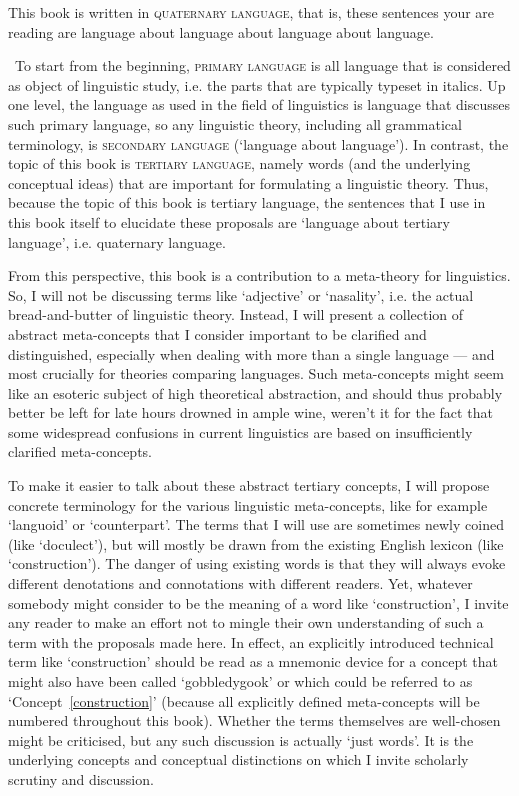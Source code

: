 This book is written in \textsc{quaternary language}, that is, these sentences your are reading are language about language about language about language.



\ \newline To start from the beginning, \textsc{primary language} is all language that is considered as object of linguistic study, i.e. the parts that are typically typeset in italics. Up one level, the language as used in the field of linguistics is language that discusses such primary language, so any linguistic theory, including all grammatical terminology, is \textsc{secondary language} (`language about language'). In contrast, the topic of this book is \textsc{tertiary language}, namely words (and the underlying conceptual ideas) that are important for formulating a linguistic theory. Thus, because the topic of this book is tertiary language, the sentences that I use in this book itself to elucidate these proposals are `language about tertiary language', i.e. quaternary language.

From this perspective, this book is a contribution to a meta-theory for linguistics. So, I will not be discussing terms like `adjective' or `nasality', i.e. the actual bread-and-butter of linguistic theory. Instead, I will present a collection of abstract meta-concepts that I consider important to be clarified and distinguished, especially when dealing with more than a single language --- and most crucially for theories comparing languages. Such meta-concepts might seem like an esoteric subject of high theoretical abstraction, and should thus probably better be left for late hours drowned in ample wine, weren't it for the fact that some widespread confusions in current linguistics are based on insufficiently clarified meta-concepts.

To make it easier to talk about these abstract tertiary concepts, I will propose concrete terminology for the various linguistic meta-concepts, like for example `languoid' or `counterpart'. The terms that I will use are sometimes newly coined (like `doculect'), but will mostly be drawn from the existing English lexicon (like `construction'). The danger of using existing words is that they will always evoke different denotations and connotations with different readers. Yet, whatever somebody might consider to be the meaning of a word like `construction', I invite any reader to make an effort not to mingle their own understanding of such a term with the proposals made here. In effect, an explicitly introduced technical term like `construction' should be read as a mnemonic device for a concept that might also have been called `gobbledygook' or which could be referred to as `Concept~\ref{construction}' (because all explicitly defined meta-concepts will be numbered throughout this book). Whether the terms themselves are well-chosen might be criticised, but any such discussion is actually `just words'. It is the underlying concepts and conceptual distinctions on which I invite scholarly scrutiny and discussion.

